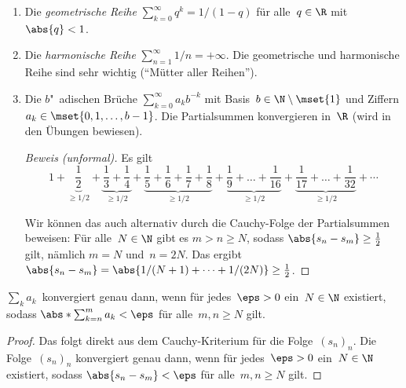 \documentclass[a4paper]{article}
\begin{document}
\begin{example}\leavevmode
    \begin{enumerate}
        \item Die \emph{geometrische Reihe} $\sum_{k=0}^\infty q^k = 1/(1-q)$ für alle~$q \in \R$ mit~$\abs{q} < 1$.
        \item Die \emph{harmonische Reihe} $\sum_{n=1}^\infty 1/n = +\infty$. Die geometrische und harmonische Reihe sind sehr wichtig ("`Mütter aller Reihen"').
        \item Die $b$"~adischen Brüche $\sum_{k=0}^\infty a_k b^{-k}$ mit Basis~$b \in \N\setminus\mset{1}$ und Ziffern $a_k \in \mset{0, 1, \dots, b-1}$. Die Partialsummen konvergieren in~$\R$ (wird in den Übungen bewiesen).
              \begin{proof}[Beweis (unformal)]
                  Es gilt
                  \begin{equation*}
                      1 + \underbrace{\frac{1}{2}}_{\geq 1/2} + \underbrace{\frac{1}{3} + \frac{1}{4}}_{\geq 1/2} + \underbrace{\frac{1}{5} + \frac{1}{6} + \frac{1}{7} + \frac{1}{8}}_{\geq 1/2} + \underbrace{\frac{1}{9} + \dots + \frac{1}{16}}_{\geq 1/2} + \underbrace{\frac{1}{17} + \dots + \frac{1}{32}}_{\geq 1/2} + \cdots
                  \end{equation*}

                  Wir können das auch alternativ durch die Cauchy-Folge der Partialsummen beweisen: Für alle~$N \in \N$ gibt es $m > n \geq N$, sodass $\abs{s_n - s_m} \geq \frac{1}{2}$ gilt, nämlich $m = N$ und~$n = 2N$. Das ergibt $\abs{s_n - s_m} = \abs{1/(N+1) + \dots + 1/(2N)} \geq \frac{1}{2}$.
              \end{proof}
    \end{enumerate}
\end{example}

\begin{theorem}
    $\sum_k a_k$~konvergiert genau dann, wenn für jedes~$\eps > 0$ ein~$N \in \N$ existiert, sodass $\abs*{\sum_{k=n}^m a_k} < \eps$ für alle~$m, n \geq N$ gilt.
\end{theorem}

\begin{proof}
    Das folgt direkt aus dem Cauchy-Kriterium für die Folge~$(s_n)_n$. Die Folge~$(s_n)_n$ konvergiert genau dann, wenn für jedes~$\eps > 0$ ein~$N \in \N$ existiert, sodass $\abs{s_n-s_m} < \eps$ für alle~$m, n \geq N$ gilt.
\end{proof}
\end{document}
